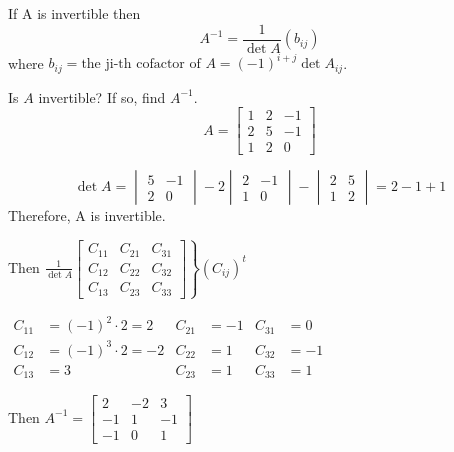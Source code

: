 \documentclass[../main.tex]{subfiles}
\begin{document}
\begin{theorem}
    If A is invertible then
    \[ A^{-1} = \displaystyle \frac{1}{\det A}(b_{ij})\]
    where \( b_{ij} = \text{the ji-th cofactor of } A = (-1)^{i+j} \det A_{ij}\).
\end{theorem}

\begin{example}
    Is \( A \) invertible? If so, find \( A^{-1} \).
    \[ A = \begin{bmatrix}
        1 & 2 & -1 \\
        2 & 5 & -1 \\
        1 & 2 & 0
    \end{bmatrix} \]

    \[ \det A = \begin{vmatrix}
        5 & -1 \\
        2 & 0
    \end{vmatrix}
    -2 \begin{vmatrix}
        2 & -1 \\
        1 & 0
    \end{vmatrix}
    - \begin{vmatrix}
        2 & 5 \\
        1 & 2
    \end{vmatrix}
    = 2-1+1 \]
    Therefore, A is invertible.

    Then \( \left. \displaystyle \frac{1}{\det A}
    \begin{bmatrix}
        C_{11} & C_{21} & C_{31} \\
        C_{12} & C_{22} & C_{32} \\
        C_{13} & C_{23} & C_{33}
    \end{bmatrix} \right\} (C_{ij})^t \)

    \( \begin{aligned}
        C_{11} &= (-1)^2 \cdot 2 = 2 & C_{21} &= -1 & C_{31} &= 0 \\
        C_{12} &= (-1)^3 \cdot 2 = -2 & C_{22} &= 1 & C_{32} &= -1 \\
        C_{13} &= 3 & C_{23} &= 1 & C_{33} &= 1
    \end{aligned} \)

    Then \( A^{-1} = \begin{bmatrix}
        2 & -2 & 3 \\
        -1 & 1 & -1 \\
        -1 & 0 & 1
    \end{bmatrix} \)
\end{example}
\end{document}

